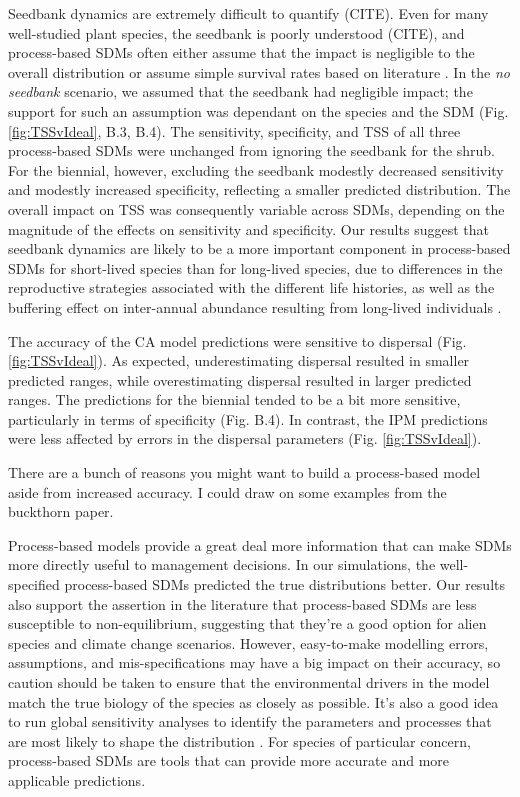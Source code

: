 \documentclass[preprint,review,times,12pt]{elsarticle}
\begin{document}
Seedbank dynamics are extremely difficult to quantify (CITE). Even for many well-studied plant species, the seedbank is poorly understood (CITE), and process-based SDMs often either assume that the impact is negligible to the overall distribution \citep{Merow2017} or assume simple survival rates based on literature \citep{Szewczyk2019}. In the \emph{no seedbank} scenario, we assumed that the seedbank had negligible impact; the support for such an assumption was dependant on the species and the SDM (Fig. \ref{fig:TSSvIdeal}, B.3, B.4). The sensitivity, specificity, and TSS of all three process-based SDMs were unchanged from ignoring the seedbank for the shrub. For the biennial, however, excluding the seedbank modestly decreased sensitivity and modestly increased specificity, reflecting a smaller predicted distribution. The overall impact on TSS was consequently variable across SDMs, depending on the magnitude of the effects on sensitivity and specificity. Our results suggest that seedbank dynamics are likely to be a more important component in process-based SDMs for short-lived species than for long-lived species, due to differences in the reproductive strategies associated with the different life histories, as well as the buffering effect on inter-annual abundance resulting from long-lived individuals \citep{Morris2003}.

The accuracy of the CA model predictions were sensitive to dispersal (Fig. \ref{fig:TSSvIdeal}). As expected, underestimating dispersal resulted in smaller predicted ranges, while overestimating dispersal resulted in larger predicted ranges. The predictions for the biennial tended to be a bit more sensitive, particularly in terms of specificity (Fig. B.4). In contrast, the IPM predictions were less affected by errors in the dispersal parameters (Fig. \ref{fig:TSSvIdeal}). 

There are a bunch of reasons you might want to build a process-based model aside from increased accuracy. I could draw on some examples from the buckthorn paper.

Process-based models provide a great deal more information that can make SDMs more directly useful to management decisions. In our simulations, the well-specified process-based SDMs predicted the true distributions better. Our results also support the assertion in the literature that process-based SDMs are less susceptible to non-equilibrium, suggesting that they're a good option for alien species and climate change scenarios. However, easy-to-make modelling errors, assumptions, and mis-specifications may have a big impact on their accuracy, so caution should be taken to ensure that the environmental drivers in the model match the true biology of the species as closely as possible. It's also a good idea to run global sensitivity analyses to identify the parameters and processes that are most likely to shape the distribution \citep{Prowse2016,Aiello-Lammens2017}. For species of particular concern, process-based SDMs are tools that can provide more accurate and more applicable predictions.
\end{document}
